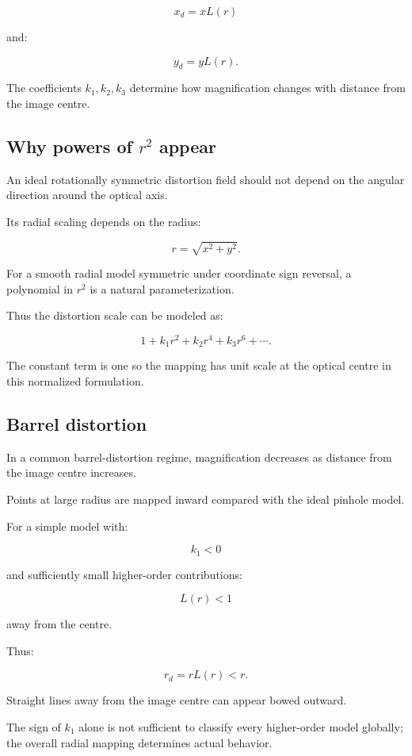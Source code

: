 \[
 \boxed{ x_d=xL(r) }
\]

and:

\[
 \boxed{ y_d=yL(r) }.
\]

The coefficients \(k_1,k_2,k_3\) determine how magnification changes with distance from the image centre.

\subsection{\texorpdfstring{Why powers of \(r^2\) appear}{Why powers of r\^{}2 appear}}\label{02-foundations-ii-ch035-why-powers-of-r2-appear}

An ideal rotationally symmetric distortion field should not depend on the angular direction around the optical axis.

Its radial scaling depends on the radius:

\[
 r=\sqrt{x^2+y^2}.
\]

For a smooth radial model symmetric under coordinate sign reversal, a polynomial in \(r^2\) is a natural parameterization.

Thus the distortion scale can be modeled as:

\[
 1+k_1r^2+k_2r^4+k_3r^6+\cdots.
\]

The constant term is one so the mapping has unit scale at the optical centre in this normalized formulation.

\subsection{Barrel distortion}\label{02-foundations-ii-ch035-barrel-distortion}

In a common barrel-distortion regime, magnification decreases as distance from the image centre increases.

Points at large radius are mapped inward compared with the ideal pinhole model.

For a simple model with:

\[
 k_1<0
\]

and sufficiently small higher-order contributions:

\[
 L(r)<1
\]

away from the centre.

Thus:

\[
 r_d=rL(r)<r.
\]

Straight lines away from the image centre can appear bowed outward.

The sign of \(k_1\) alone is not sufficient to classify every higher-order model globally; the overall radial mapping determines actual behavior.

